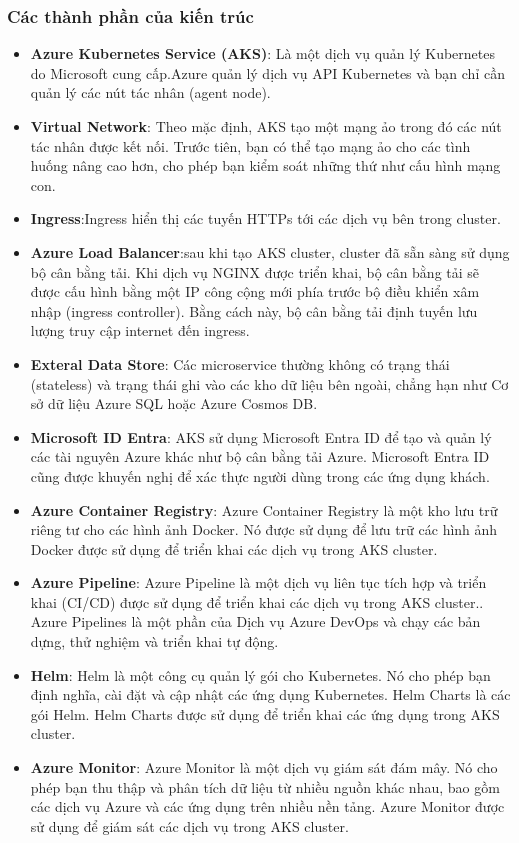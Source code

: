 \subsubsection{Các thành phần của kiến trúc}
\begin{itemize}
    \item \textbf{Azure Kubernetes Service (AKS)}: Là một dịch vụ quản lý Kubernetes do Microsoft cung cấp.Azure quản lý dịch vụ API Kubernetes và bạn chỉ cần quản lý các nút tác nhân (agent node).
    \item \textbf{Virtual Network}: Theo mặc định, AKS tạo một mạng ảo trong đó các nút tác nhân được kết nối. Trước tiên, bạn có thể tạo mạng ảo cho các tình huống nâng cao hơn, cho phép bạn kiểm soát những thứ như cấu hình mạng con.
    \item \textbf{Ingress}:Ingress hiển thị các tuyến HTTPs tới các dịch vụ bên trong cluster.
    \item \textbf{Azure Load Balancer}:sau khi tạo AKS cluster, cluster đã sẵn sàng sử dụng bộ cân bằng tải. Khi dịch vụ NGINX được triển khai, bộ cân bằng tải sẽ được cấu hình bằng một IP công cộng mới phía trước bộ điều khiển xâm nhập (ingress controller). Bằng cách này, bộ cân bằng tải định tuyến lưu lượng truy cập internet đến ingress.
    \item \textbf{Exteral Data Store}: Các microservice thường không có trạng thái (stateless) và trạng thái ghi vào các kho dữ liệu bên ngoài, chẳng hạn như Cơ sở dữ liệu Azure SQL hoặc Azure Cosmos DB.
    \item \textbf{Microsoft ID Entra}: AKS sử dụng Microsoft Entra ID để tạo và quản lý các tài nguyên Azure khác như bộ cân bằng tải Azure. Microsoft Entra ID cũng được khuyến nghị để xác thực người dùng trong các ứng dụng khách.
    \item \textbf{Azure Container Registry}: Azure Container Registry là một kho lưu trữ riêng tư cho các hình ảnh Docker. Nó được sử dụng để lưu trữ các hình ảnh Docker được sử dụng để triển khai các dịch vụ trong AKS cluster.
    \item \textbf{Azure Pipeline}: Azure Pipeline là một dịch vụ liên tục tích hợp và triển khai (CI/CD) được sử dụng để triển khai các dịch vụ trong AKS cluster.. Azure Pipelines là một phần của Dịch vụ Azure DevOps và chạy các bản dựng, thử nghiệm và triển khai tự động.
    \item \textbf{Helm}: Helm là một công cụ quản lý gói cho Kubernetes. Nó cho phép bạn định nghĩa, cài đặt và cập nhật các ứng dụng Kubernetes. Helm Charts là các gói Helm. Helm Charts được sử dụng để triển khai các ứng dụng trong AKS cluster.
    \item \textbf{Azure Monitor}: Azure Monitor là một dịch vụ giám sát đám mây. Nó cho phép bạn thu thập và phân tích dữ liệu từ nhiều nguồn khác nhau, bao gồm các dịch vụ Azure và các ứng dụng trên nhiều nền tảng. Azure Monitor được sử dụng để giám sát các dịch vụ trong AKS cluster.
\end{itemize}
